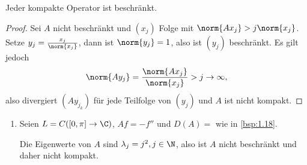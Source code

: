 \begin{prop}
\label{prop:1.24}
Jeder kompakte Operator ist beschränkt.\fishhere
\end{prop}
\begin{proof}
Sei $A$ nicht beschränkt und $(x_j)$ Folge mit $\norm{Ax_j} > j\norm{x_j}$.
Setze $y_j = \frac{x_j}{\norm{x_j}}$, dann ist $\norm{y_j} = 1$, also ist
$(y_j)$ beschränkt. Es gilt jedoch
\begin{align*}
\norm{Ay_j} = \frac{\norm{Ax_j}}{\norm{x_j}} > j \to\infty,
\end{align*}
also divergiert $(Ay_{j_k})$ für jede Teilfolge von $(y_j)$ und  $A$ ist
nicht kompakt.\qedhere
\end{proof}

\begin{bsp}
\label{bsp:1.25}
\begin{enumerate}[label=\arabic{*}.)]
\item Seien $L=C([0,\pi]\to\C)$, $Af = -f''$ und $D(A) = $ wie in
\ref{bsp:1.18}.

Die Eigenwerte von $A$ sind $\lambda_j = j^2, j\in\N$, also ist $A$ nicht
beschränkt und daher nicht kompakt.


\end{enumerate}
\end{bsp}
